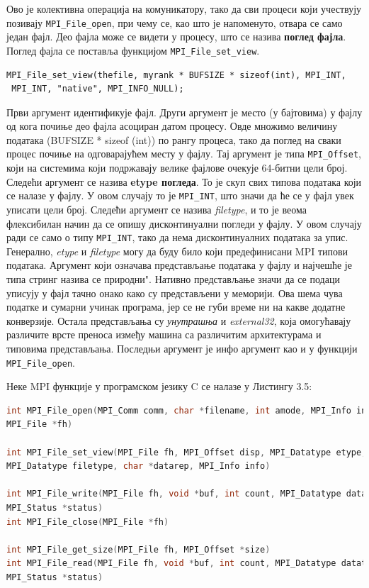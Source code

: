 Ово је колективна операција  на комуникатору, тако да сви процеси који учествују позивају \texttt{MPI\_File\_open}, при чему се, као што је напоменуто, отвара се само један фајл. Део фајла може се видети у процесу, што се назива \textbf{поглед фајла}. Поглед фајла се поставља функцијом \texttt{MPI\_File\_set\_view}.

\begin{verbatim}
MPI_File_set_view(thefile, myrank * BUFSIZE * sizeof(int), MPI_INT,
 MPI_INT, "native", MPI_INFO_NULL);
\end{verbatim}

Први аргумент идентификује фајл. Други аргумент је место (у бајтовима) у фајлу од кога почиње део фајла асоциран датом процесу.
Овде множимо величину података (BUFSIZE * sizeof (int)) по рангу процеса, тако да поглед на сваки процес почиње на одговарајућем месту у фајлу.
Тај аргумент је типа \texttt{MPI\_Offset}, који на системима који подржавају велике фајлове очекује 64-битни цели број. Следећи аргумент се назива \textbf{etype погледа}. То је скуп свих типова података који се налазе у фајлу. У овом случају то је \texttt{MPI\_INT}, што значи да ће се у фајл увек уписати цели број. Следећи аргумент се назива \textit{filetype}, и то је веома флексибилан начин да се опишу дисконтинуални погледи у фајлу. У овом случају ради се само о типу \texttt{MPI\_INT}, тако да нема дисконтинуалних података за упис. Генерално, \textit{etype} и \textit{filetype} могу да буду било који предефинисани MPI типови података. Аргумент који означава представљање података у фајлу и најчешће је типа стринг назива се \zn природни". Нативно представљање значи да се подаци уписују у фајл тачно онако како су представљени у меморији. Ова шема чува податке и сумарни учинак програма, јер се не губи време ни на какве додатне конверзије.
Остала представљања су \textit{унутрашња} и \textit{external32}, која омогућавају различите врсте преноса између машина са различитим архитектурама и типовима представљања.
Последњи аргумент је инфо аргумент као и у функцији \texttt{MPI\_File\_open}.

Неке MPI функције у програмском језику C се налазе у Листингу 3.5:

\begin{lstlisting}[style=nonumbers,frame=single, language=C, caption=MPI функције]
int MPI_File_open(MPI_Comm comm, char *filename, int amode, MPI_Info info,
MPI_File *fh)

int MPI_File_set_view(MPI_File fh, MPI_Offset disp, MPI_Datatype etype,
MPI_Datatype filetype, char *datarep, MPI_Info info)

int MPI_File_write(MPI_File fh, void *buf, int count, MPI_Datatype datatype,
MPI_Status *status)
int MPI_File_close(MPI_File *fh)

int MPI_File_get_size(MPI_File fh, MPI_Offset *size)
int MPI_File_read(MPI_File fh, void *buf, int count, MPI_Datatype datatype,
MPI_Status *status)
\end{lstlisting}

